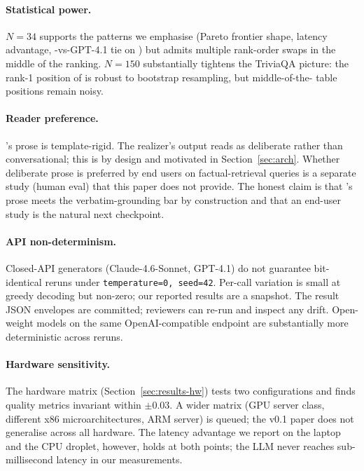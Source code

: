 \paragraph{Statistical power.} $N=34$ supports the patterns we
emphasise (Pareto frontier shape, latency advantage,
\hyphae{}-vs-GPT-4.1 tie on \unsupf{}) but admits multiple
rank-order swaps in the middle of the ranking. $N=150$
substantially tightens the TriviaQA picture: the rank-1 position
of \hyphae{} is robust to bootstrap resampling, but middle-of-the-
table positions remain noisy.

\paragraph{Reader preference.} \hyphae{}'s prose is template-rigid.
The realizer's output reads as deliberate rather than
conversational; this is by design and motivated in
Section~\ref{sec:arch}. Whether deliberate prose is preferred by
end users on factual-retrieval queries is a separate study (human
eval) that this paper does not provide. The honest claim is that
\hyphae{}'s prose meets the verbatim-grounding bar by construction
and that an end-user study is the natural next checkpoint.

\paragraph{API non-determinism.} Closed-API generators
(Claude-4.6-Sonnet, GPT-4.1) do not guarantee bit-identical
reruns under \texttt{temperature=0, seed=42}. Per-call
variation is small at greedy decoding but non-zero; our reported
results are a snapshot. The result JSON envelopes are committed;
reviewers can re-run and inspect any drift. Open-weight models
on the same OpenAI-compatible endpoint are substantially more
deterministic across reruns.

\paragraph{Hardware sensitivity.} The hardware matrix
(Section~\ref{sec:results-hw}) tests two configurations and
finds quality metrics invariant within $\pm 0.03$. A wider matrix
(GPU server class, different x86 microarchitectures, ARM server)
is queued; the v0.1 paper does not generalise across all
hardware. The latency advantage we report on the laptop and the
CPU droplet, however, holds at both points; the LLM never reaches
sub-millisecond latency in our measurements.

